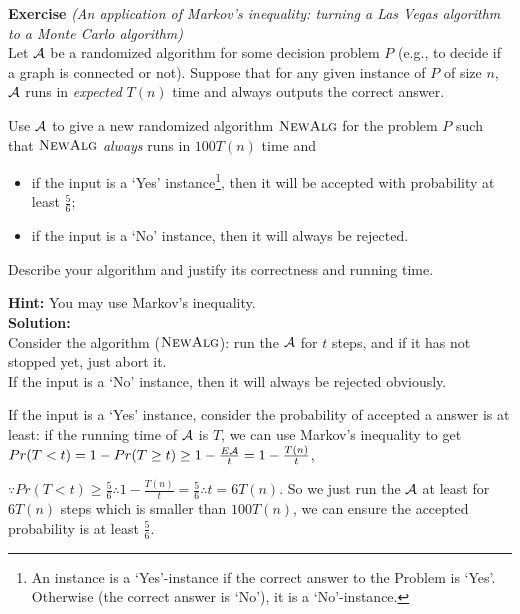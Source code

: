 \documentclass[a4paper,10pt]{article}
\newcounter{aufgc}
\newenvironment{exercise}[1]%
{\refstepcounter{aufgc}\textbf{Exercise \arabic{aufgc}} \emph{#1}\\}
{
	
	\hrulefill\medskip}%
\begin{document}
\begin{exercise}{(An application of Markov's inequality: turning a Las Vegas algorithm to a Monte Carlo algorithm)}

	Let $\mathcal{A}$ be a randomized algorithm for some decision problem $P$ (e.g., to decide if a graph is connected or not). Suppose that for any given instance of $P$ of size $n$, $\mathcal{A}$ runs in \emph{expected} $T(n)$ time and always outputs the correct answer.

	Use $\mathcal{A}$ to give a new randomized algorithm $\textsc{NewAlg}$ for the problem $P$ such that $\textsc{NewAlg}$ \emph{always} runs in $100 T(n)$ time and
	\begin{itemize}
		\item if the input is a `Yes' instance\footnote{An instance is a `Yes'-instance if the correct answer to the Problem is `Yes'. Otherwise (the correct answer is `No'), it is a `No'-instance. }, then it will be accepted with probability at least $\frac56$;
		\item if the input is a `No' instance, then it will always be rejected.
	\end{itemize}
	Describe your algorithm and justify its correctness and running time.

	\vspace{1em}
	\textbf{Hint:} You may use Markov's inequality.\\

	\textbf{Solution:} \\

	Consider the algorithm ($\textsc{NewAlg}$): run the $\mathcal{A}$ for $t$ steps, and if it has not stopped yet, just abort it.  \\

	If the input is a `No' instance, then it will always be rejected obviously.

	If the input is a `Yes' instance, consider the probability of accepted a answer is at least: if the running time of $\mathcal{A}$ is $T$, we can use Markov's inequality to get
	$Pr(T < t) = 1 - Pr(T\ge t) \ge 1-\frac{E\mathcal{A}}{t} = 1-\frac{T(n)}{t}$,

	$\because Pr(T < t) \ge \frac{5}{6} \therefore 1-\frac{T(n)}{t} = \frac{5}{6} \therefore t=6T(n)$.
	So we just run the $\mathcal{A}$ at least for $6T(n)$ steps which is smaller than $100T(n)$, we can ensure the accepted probability is at least  $\frac56$.



\end{exercise}
\end{document}

